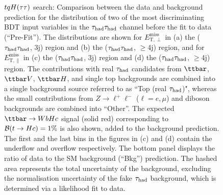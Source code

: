 \begin{figure}[t]
\begin{center}
\caption{$tqH(\tau\tau)$ search: Comparison between the data and background prediction for the distribution of two of the most 
discriminating BDT input variables in the $\tau_{\mathrm{had}} \tau_{\mathrm{had}}$ channel before the fit to data (``Pre-Fit''). The distributions are shown for
$E_{\text{T},\perp}^{\text{miss}}$ in (a) the ($\tau_{\mathrm{had}} \tau_{\mathrm{had}}$, 3j) region and (b) the ($\tau_{\mathrm{had}} \tau_{\mathrm{had}}$, $\geq$4j) region, and for
$E_{\text{T},\parallel}^{\text{miss}}$ in (c) the ($\tau_{\mathrm{had}} \tau_{\mathrm{had}}$, 3j)  region and (d) the ($\tau_{\mathrm{had}} \tau_{\mathrm{had}}$, $\geq$4j) region.
The contributions with real $\tau_{\mathrm{had}}$ candidates from $\ttbar$,  $\ttbar V$, $\ttbar H$, and single top backgrounds are combined into
a single background source referred to as ``Top (real $\tau_{\mathrm{had}}$)", whereas the small contributions from 
$Z\to \ell^+\ell^-$ ($\ell = e, \mu$) and diboson backgrounds are combined into ``Other''. 
The expected $\Hc$ signal (solid red) corresponding to $\mathcal{B}(t\to Hc)=1\%$ is also shown,
added to the background prediction.
The first and the last bins in the figures in (c) and (d) contain the underflow and overflow respectively.
The bottom panel displays the ratio of data to the SM background (``Bkg'') prediction.
The hashed area represents the total uncertainty of the background, excluding the normalisation uncertainty of the fake $\tau_{\mathrm{had}}$ background, 
which is determined via a likelihood fit to data.} 
\label{fig:BDT_inputs_hadhad_4}
\end{center}
\end{figure}



